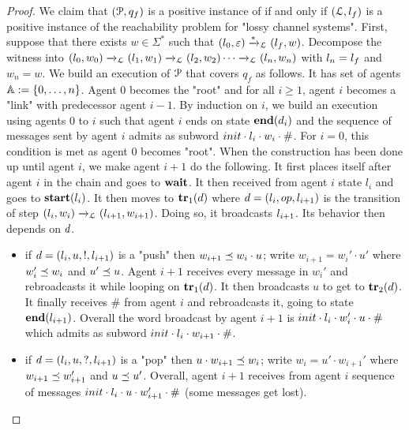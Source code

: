\begin{proof}
We claim that $(\mathcal{P}, q_f)$ is a positive instance of \COVER if and only if $(\mathcal{L}, l_f)$ is a positive instance of the reachability problem for "lossy channel systems".
First, suppose that there exists $w \in \Sigma^*$ such that $(l_0, \varepsilon) \xrightarrow{*}_{\mathcal{L}} (l_f, w)$. Decompose the witness into $(l_0, w_0) \xrightarrow{}_{\mathcal{L}} (l_1, w_1) \xrightarrow{}_{\mathcal{L}} (l_2, w_2) \cdots \xrightarrow{}_{\mathcal{L}} (l_n,w_n)$ with $l_n = l_f$ and $w_n =w$. 
We build an execution of $\mathcal{P}$ that covers $q_f$ as follows. It has set of agents $\mathbb{A} := \{0,\dots, n\}$. Agent $0$ becomes the "root" and for all $i \geq 1$, agent $i$ becomes a "link" with predecessor agent $i-1$. By induction on $i$, we build an execution using agents $0$ to $i$ such that agent $i$ ends on state $\mathbf{end}(d_i)$ and the sequence of messages sent by agent $i$ admits as subword $\mathsf{init} \cdot \mathsf{\lstate_i} \cdot w_i \cdot \mathsf{\#}$. For $i=0$, this condition is met as agent $0$ becomes "root". When the construction has been done up until agent $i$, we make agent $i+1$ do the following. It first places itself after agent $i$ in the chain and goes to $\mathbf{wait}$. It then received from agent $i$ state $l_i$ and goes to $\mathbf{start}(l_i)$. It then moves to $\mathbf{tr}_1(d)$ where $\ltrans = (\lstate_i, \mathsf{op}, \lstate_{i+1})$ is the transition of step $(l_i, w_i) \xrightarrow{}_{\mathcal{L}} (l_{i+1}, w_{i+1})$. Doing so, it broadcasts $\mathsf{\lstate_{i+1}}$. Its behavior then depends on $d$.
\begin{itemize}
\item if $d =(l_i, u,!, l_{i+1})$ is a "push" then $w_{i+1} \preceq w_i \cdot u$; write $w_{i+1} = w_{i}' \cdot u'$ where $w_i' \preceq w_i$ and $u' \preceq u$. Agent $i+1$ receives every message in $w_i'$ and rebroadcasts it while looping on $\mathbf{tr}_1(d)$. It then broadcasts $u$ to get to $\mathbf{tr}_2(d)$. It finally receives $\mathsf{\#}$ from agent $i$ and rebroadcasts it, going to state $\mathbf{end}(l_{i+1})$. Overall the word broadcast by agent $i+1$ is $\mathsf{init} \cdot \mathsf{\lstate_i} \cdot w'_i \cdot u \cdot \mathsf{\#}$ which admits as subword $\mathsf{init} \cdot \mathsf{\lstate_i} \cdot w_{i+1} \cdot \mathsf{\#}$.
\item if $d =(l_i, u,?, l_{i+1})$ is a "pop" then $u \cdot w_{i+1} \preceq w_i$; write $w_{i} = u' \cdot w_{i+1}'$ where $w_{i+1} \preceq w_{i+1}'$ and $u \preceq u'$. Overall, agent $i+1$ receives from agent $i$ sequence of messages $\mathsf{init} \cdot \mathsf{\lstate_i} \cdot u \cdot w_{i+1}' \cdot \mathsf{\#}$ (some messages get lost). 

\end{itemize}
\end{proof}

